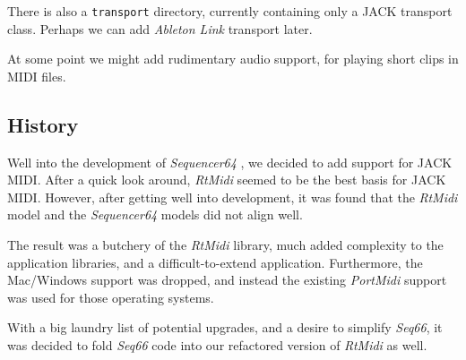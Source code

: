 \documentclass[
 11pt,
 twoside,
 a4paper,
 final                                 %
]{article}
\begin{document}
   There is also a \texttt{transport} directory, currently containing only
   a JACK transport class.  Perhaps we can add \textsl{Ableton Link}
   \cite{link} transport later.

   At some point we might add rudimentary audio support, for playing
   short clips in MIDI files.

\subsection{History}
\label{subsec:history}

   Well into the development of \textsl{Sequencer64} \cite{seq64},
   we decided to add support for JACK MIDI.  After a quick look around,
   \textsl{RtMidi} seemed to be the best basis for JACK MIDI.  However, after
   getting well into development, it was found that the \textsl{RtMidi} model
   and the \textsl{Sequencer64} models did not align well.

   The result was a butchery of the \textsl{RtMidi} library, much added
   complexity to the application libraries, and a difficult-to-extend
   application.  Furthermore, the Mac/Windows support was dropped, and
   instead the existing \textsl{PortMidi} \cite{portmidi} support was
   used for those operating systems.

   With a big laundry list of potential upgrades, and a desire to
   simplify \textsl{Seq66}, it was decided to fold \textsl{Seq66} code
   into our refactored version of \textsl{RtMidi} as well.















\printindex
\end{document}
